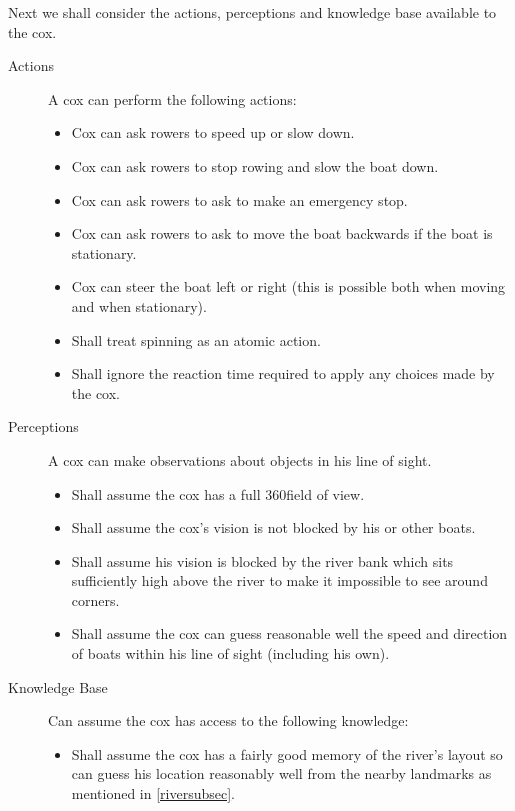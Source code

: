   Next we shall consider the actions, perceptions and knowledge base available to the cox.
  
  \begin{description}
    \item[Actions] A cox can perform the following actions:
      \begin{itemize}
        \item Cox can ask rowers to speed up or slow down.
        \item Cox can ask rowers to stop rowing and slow the boat down.
        \item Cox can ask rowers to ask to make an emergency stop.
        \item Cox can ask rowers to ask to move the boat backwards if the boat is stationary.
        \item Cox can steer the boat left or right (this is possible both when moving and when stationary).
        \item Shall treat spinning as an atomic action.
        \item Shall ignore the reaction time required to apply any choices
          made by the cox.
        \end{itemize}
    \item[Perceptions] A cox can make observations about objects in
      his line of sight.
      \begin{itemize}
        \item Shall assume the cox has a full 360\textdegree field of
          view.
        \item Shall assume the cox's vision is not blocked by his or other boats.
        \item Shall assume his
        vision is blocked by the river bank which sits sufficiently high
        above the river to make it impossible to see around corners.
        \item Shall assume the cox can guess reasonable well the speed and
        direction of boats within his line of sight (including his own).
        \end{itemize}
    \item[Knowledge Base] Can assume the cox has access to the
      following knowledge:
      \begin{itemize}
        \item Shall assume the cox has a fairly good memory of the river's
          layout so can guess his location reasonably well from the nearby
          landmarks as mentioned in \ref{riversubsec}.
      \end{itemize}
  \end{description}

